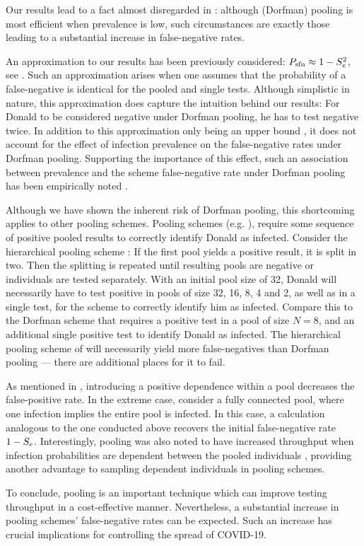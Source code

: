 \documentclass{article}
\begin{document}
Our results lead to a fact almost disregarded in
\cite{DorfmanYuvalDor}: although (Dorfman) pooling is most efficient
when prevalence is low, such circumstances are exactly those leading
to a substantial increase in false-negative rates.

An approximation to our results has been previously considered: $P_{\text{sfn}}
\approx 1-S_e^2 $, see \cite{Simplistic1, Simplistic2, Kim,
  OptimalDorfmanPool}. Such an approximation arises when one assumes
that the probability of a false-negative is identical for the pooled
and single tests. Although simplistic in nature, this approximation
does capture the intuition behind our results: For Donald to be
considered negative under Dorfman pooling, he has to test negative
twice. In addition to this approximation only being an upper bound
\cite{Simplistic2}, it does not account for the effect of infection
prevalence on the false-negative rates under Dorfman
pooling. Supporting the importance of this effect, such an association
between prevalence and the scheme false-negative rate under Dorfman
pooling has been empirically noted \cite{DorfmanYuvalDor}.

Although we have shown the inherent risk of Dorfman pooling, this
shortcoming applies to other pooling schemes. Pooling schemes
(e.g. \cite{MatrixPooling,Lion, Kim}), require some sequence of
positive pooled results to correctly identify Donald as
infected. Consider the hierarchical pooling scheme \cite{Lion, Kim}:
If the first pool yields a positive result, it is split in two. Then
the splitting is repeated until resulting pools are negative or
individuals are tested separately. With an initial pool size of 32,
Donald will necessarily have to test positive in pools of size 32, 16,
8, 4 and 2, as well as in a single test, for the scheme to correctly
identify him as infected. Compare this to the Dorfman scheme that
requires a positive test in a pool of size $N=8$, and an additional
single positive test to identify Donald as infected. The hierarchical
pooling scheme of \cite{Lion, Kim} will necessarily yield more
false-negatives than Dorfman pooling --- there are additional places
for it to fail.

As mentioned in \cite{DorfmanYuvalDor}, introducing a positive
dependence within a pool decreases the false-positive rate. In the
extreme case, consider a fully connected pool, where one infection
implies the entire pool is infected. In this case, a calculation
analogous to the one conducted above recovers the initial
false-negative rate $1-S_e$. Interestingly, pooling was also noted to
have increased throughput when infection probabilities are dependent
between the pooled individuals \cite{DorfmanYuvalDor}, providing
another advantage to sampling dependent individuals in pooling
schemes.

To conclude, pooling is an important technique which can improve
testing throughput in a cost-effective manner. Nevertheless, a
substantial increase in pooling schemes' false-negative rates can be
expected. Such an increase has crucial implications for controlling
the spread of COVID-19.





%

\end{document}
